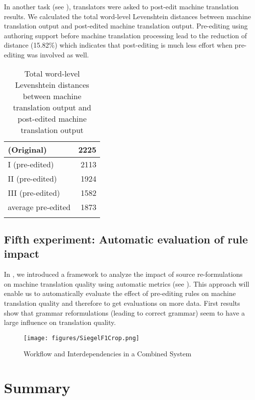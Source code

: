 \documentclass[output=paper]{LSP/langsci}
\begin{document}
In another task (see ), translators were asked to post-edit machine translation results. We calculated the total word-level Levenshtein distances between machine translation output and post-edited machine translation output. Pre-ed\-iting using authoring support before machine translation processing lead to the reduction of distance (15.82\%) which indicates that post-editing is much less effort when pre-editing was involved as well.

\begin{table}
\begin{tabular}{lr}
\lsptoprule
(Original) & 2225\\
\midrule
I (pre-edited) &  2113\\
II (pre-edited) &   1924\\
III (pre-edited) &  1582\\
average pre-edited &  1873\\
\lspbottomrule
\end{tabular}
\caption{Total word-level Levenshtein distances between machine translation output and post-edited machine translation output}
\label{tab:siegel:4}
\end{table}

\subsection{Fifth experiment: Automatic evaluation of rule impact}\label{sec:siegel:6.5}

In \citet{RoturierEtAl2012}, we introduced a framework to analyze the impact of source re-formulations on machine translation quality using automatic metrics (see ). This approach will enable us to automatically evaluate the effect of pre-editing rules on machine translation quality and therefore to get evaluations on more data. First results show that grammar reformulations (leading to correct grammar) seem to have a large influence on translation quality. 

\begin{figure}
\texttt{[image: figures/SiegelF1Crop.png]}
\caption{Workflow and Interdependencies in a Combined System}
\label{fig:siegel:1}
\end{figure}  

\section{Summary}\label{sec:siegel:7}
\end{document}
